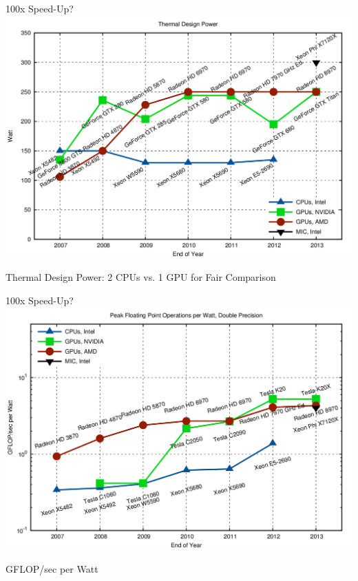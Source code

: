\begin{frame}{100x Speed-Up?}
 \includegraphics[width=\textwidth]{figures/tdp}
 \begin{center}
  Thermal Design Power: 2 CPUs vs. 1 GPU for Fair Comparison
 \end{center}
\end{frame}

\begin{frame}{100x Speed-Up?}
 \includegraphics[width=\textwidth]{figures/gflops-per-watt-dp}
 \begin{center}
  GFLOP/sec per Watt
 \end{center}
\end{frame}

